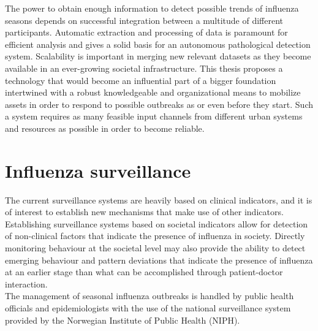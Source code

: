 The power to obtain enough information to detect possible trends of influenza seasons depends on successful integration between a multitude of different participants. Automatic extraction and processing of data is paramount for efficient analysis and gives a solid basis for an autonomous pathological detection system. Scalability is important in merging new relevant datasets as they become available in an ever-growing societal infrastructure. This thesis proposes a technology that would become an influential part of a bigger foundation intertwined with a robust knowledgeable and organizational means to mobilize assets in order to respond to possible outbreaks as or even before they start. Such a system requires as many feasible input channels from different urban systems and resources as possible in order to become reliable.


\newpage


\section{Influenza surveillance}
The current surveillance systems are heavily based on clinical indicators, and it is of interest to establish new mechanisms that make use of other indicators. Establishing surveillance systems based on societal indicators allow for detection of non-clinical factors that indicate the presence of influenza in society. Directly monitoring behaviour at the societal level may also provide the ability to detect emerging behaviour and pattern deviations that indicate the presence of influenza at an earlier stage than what can be accomplished through patient-doctor interaction.\\
The management of seasonal influenza outbreaks is handled by public health officials and epidemiologists with the use of the national surveillance system provided by the Norwegian Institute of Public Health (NIPH)\cite{niph}.
  
